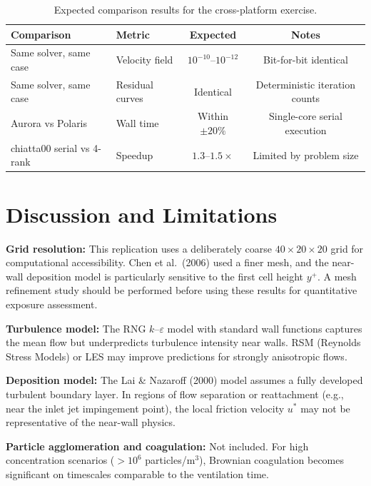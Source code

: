 \documentclass[12pt]{article}
\begin{document}
\begin{table}[H]
\centering
\caption{Expected comparison results for the cross-platform exercise.}
\begin{tabular}{llcc}
\toprule
\textbf{Comparison} & \textbf{Metric} & \textbf{Expected} & \textbf{Notes} \\
\midrule
Same solver, same case & Velocity field & $10^{-10}$--$10^{-12}$ & Bit-for-bit identical \\
Same solver, same case & Residual curves & Identical & Deterministic iteration counts \\
Aurora vs Polaris & Wall time & Within $\pm 20\%$ & Single-core serial execution \\
chiatta00 serial vs 4-rank & Speedup & $1.3$--$1.5\times$ & Limited by problem size \\
\bottomrule
\end{tabular}
\end{table}

\section{Discussion and Limitations}

\textbf{Grid resolution:} This replication uses a deliberately coarse $40 \times 20 \times 20$ grid for computational accessibility. Chen et al.~(2006) used a finer mesh, and the near-wall deposition model is particularly sensitive to the first cell height $y^+$. A mesh refinement study should be performed before using these results for quantitative exposure assessment.

\textbf{Turbulence model:} The RNG $k$--$\varepsilon$ model with standard wall functions captures the mean flow but underpredicts turbulence intensity near walls. RSM (Reynolds Stress Models) or LES may improve predictions for strongly anisotropic flows.

\textbf{Deposition model:} The Lai \& Nazaroff (2000) model assumes a fully developed turbulent boundary layer. In regions of flow separation or reattachment (e.g., near the inlet jet impingement point), the local friction velocity $u^*$ may not be representative of the near-wall physics.

\textbf{Particle agglomeration and coagulation:} Not included. For high concentration scenarios ($> 10^6$ particles/m$^3$), Brownian coagulation becomes significant on timescales comparable to the ventilation time.
\end{document}
